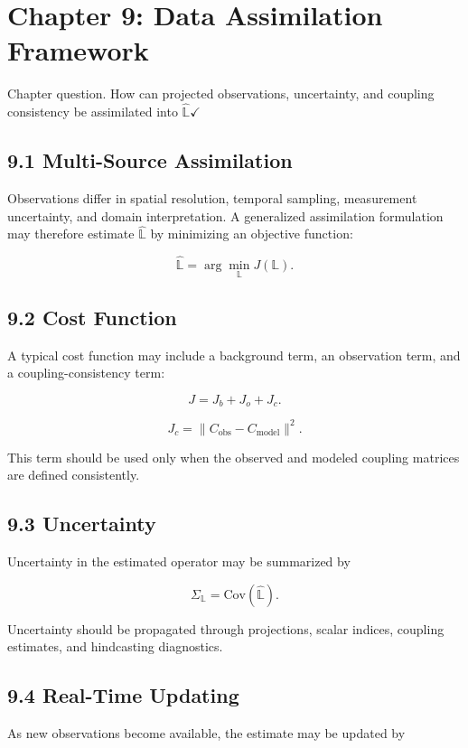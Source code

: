 \documentclass[aps,pre,reprint,superscriptaddress,nofootinbib]{revtex4-2}
\begin{document}
\section{Chapter 9: Data Assimilation Framework}

Chapter question. How can projected observations, uncertainty, and coupling consistency be assimilated into \(\hat{\mathbb{L}}\)$\checkmark$

\subsection{9.1 Multi-Source Assimilation}

Observations differ in spatial resolution, temporal sampling, measurement uncertainty, and domain interpretation. A generalized assimilation formulation may therefore estimate \(\hat{\mathbb{L}}\) by minimizing an objective function:

\[ \hat{\mathbb{L}}=\arg\min_{\mathbb{L}} J(\mathbb{L}). \]

\subsection{9.2 Cost Function}

A typical cost function may include a background term, an observation term, and a coupling-consistency term:

\[ J=J_b+J_o+J_c. \]

\[ J_c=\|C_{\mathrm{obs}}-C_{\mathrm{model}}\|^2. \]

This term should be used only when the observed and modeled coupling matrices are defined consistently.

\subsection{9.3 Uncertainty}

Uncertainty in the estimated operator may be summarized by

\[ \Sigma_{\mathbb{L}}=\mathrm{Cov}(\hat{\mathbb{L}}). \]

Uncertainty should be propagated through projections, scalar indices, coupling estimates, and hindcasting diagnostics.

\subsection{9.4 Real-Time Updating}

As new observations become available, the estimate may be updated by
\end{document}
